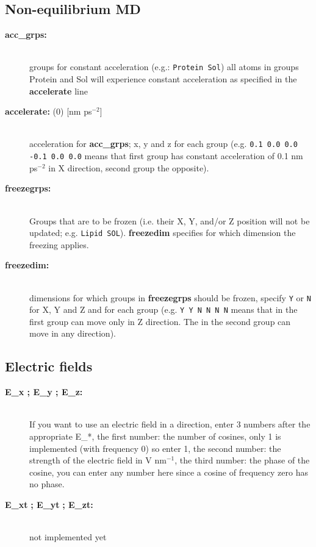 \subsection{Non-equilibrium MD}
\begin{description}
\item[{\bf acc\_grps: }]\mbox{}\\
groups for constant acceleration (e.g.: {\tt Protein Sol})
all atoms in groups Protein and Sol will experience constant acceleration
as specified in the {\bf accelerate} line
\item[{\bf accelerate: }(0) {[nm ps$^{-2}$]}]\mbox{}\\
acceleration for {\bf acc\_grps}; x, y and z for each group
(e.g. {\tt 0.1 0.0 0.0 -0.1 0.0 0.0} means that first group has constant 
acceleration of 0.1 nm ps$^{-2}$ in X direction, second group the 
opposite).
\item[{\bf freezegrps: }]\mbox{}\\
Groups that are to be frozen (i.e. their X, Y, and/or Z position will
not be updated; e.g. {\tt Lipid SOL}). {\bf freezedim} specifies for
which dimension the freezing applies.
\item[{\bf freezedim: }]\mbox{}\\
dimensions for which groups in {\bf freezegrps} should be frozen, 
specify {\tt Y} or {\tt N} for X, Y and Z and for each group
(e.g. {\tt Y Y N N N N} means that  in the first group 
can move only in Z direction. The  in the second group can 
move in any direction).
\end{description}

\subsection{Electric fields}
\begin{description}
\item[{\bf E\_x ; E\_y ; E\_z:}]\mbox{}\\
If you want to use an electric field in a direction, enter 3 numbers
after the appropriate E\_*, the first number: the number of cosines,
only 1 is implemented (with frequency 0) so enter 1,
the second number: the strength of the electric field in
V nm$^{-1}$,
the third number: the phase of the cosine, you can enter any number here
since a cosine of frequency zero has no phase.
\item[{\bf E\_xt }{\bf  ;  E\_yt }{\bf  ;  E\_zt: }]\mbox{}\\
not implemented yet
\end{description}

